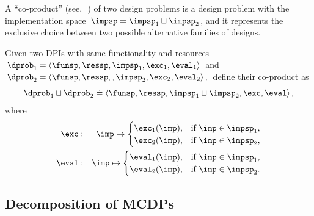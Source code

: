 A ``co-product'' (see,~\eg\,\cite[Section 2.4]{spivak14category})
of two design problems is a design problem with the implementation
space~$\impsp=\impsp_{1}\sqcup\impsp_{2}$, and it represents the
exclusive choice between two possible alternative families of designs.
\begin{definition}[Co-product]
\label{def:parallel-1}Given two DPIs with same functionality and
resources $\dprob_{1}=\left\langle \funsp,\ressp,\impsp_{1},\exc_{1},\eval_{1}\right\rangle $
and $\dprob_{2}=\left\langle \funsp,\ressp,,\impsp_{2},\exc_{2},\eval_{2}\right\rangle ,$
define their co-product as
\[
\dprob_{1}\sqcup\dprob_{2}\doteq\left\langle \funsp,\ressp,\impsp_{1}\sqcup\impsp_{2},\exc,\eval\right\rangle ,
\]
where
\begin{eqnarray}
\exc & : & \imp\mapsto\begin{cases}
\exc_{1}(\imp), & \text{if }\imp\in\impsp_{1},\\
\exc_{2}(\imp), & \text{if }\imp\in\impsp_{2},
\end{cases}\label{eq:dppar-exec-1}\\
\eval & : & \imp\mapsto\begin{cases}
\eval_{1}(\imp), & \text{if }\imp\in\impsp_{1},\\
\eval_{2}(\imp), & \text{if }\imp\in\impsp_{2}.
\end{cases}\nonumber
\end{eqnarray}

\end{definition}

\subsection{Decomposition of MCDPs\label{sec:Decomposition}}

